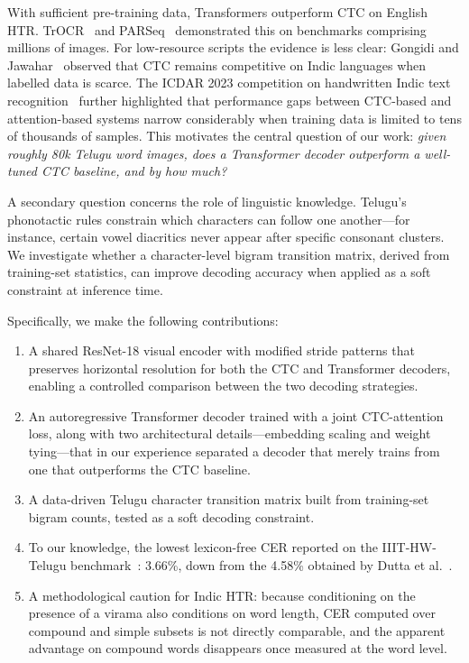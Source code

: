 \documentclass[pdflatex,sn-mathphys-num]{sn-jnl}
\begin{document}
With sufficient pre-training data, Transformers outperform CTC on English HTR. TrOCR~\cite{li2023trocr} and PARSeq~\cite{bautista2022parseq} demonstrated this on benchmarks comprising millions of images. For low-resource scripts the evidence is less clear: Gongidi and Jawahar~\cite{gongidi2021iiit} observed that CTC remains competitive on Indic languages when labelled data is scarce. The ICDAR 2023 competition on handwritten Indic text recognition~\cite{icdar2023indic} further highlighted that performance gaps between CTC-based and attention-based systems narrow considerably when training data is limited to tens of thousands of samples. This motivates the central question of our work: \textit{given roughly 80k Telugu word images, does a Transformer decoder outperform a well-tuned CTC baseline, and by how much?}

A secondary question concerns the role of linguistic knowledge. Telugu's phonotactic rules constrain which characters can follow one another---for instance, certain vowel diacritics never appear after specific consonant clusters. We investigate whether a character-level bigram transition matrix, derived from training-set statistics, can improve decoding accuracy when applied as a soft constraint at inference time.

Specifically, we make the following contributions:

\begin{enumerate}
    \item A shared ResNet-18 visual encoder with modified stride patterns that preserves horizontal resolution for both the CTC and Transformer decoders, enabling a controlled comparison between the two decoding strategies.

    \item An autoregressive Transformer decoder trained with a joint CTC-attention loss, along with two architectural details---embedding scaling and weight tying---that in our experience separated a decoder that merely trains from one that outperforms the CTC baseline.

    \item A data-driven Telugu character transition matrix built from training-set bigram counts, tested as a soft decoding constraint.

    \item To our knowledge, the lowest lexicon-free CER reported on the IIIT-HW-Telugu benchmark~\cite{gongidi2021iiit}: 3.66\%, down from the 4.58\% obtained by Dutta et al.~\cite{dutta2018}.

    \item A methodological caution for Indic HTR: because conditioning on the presence of a virama also conditions on word length, CER computed over compound and simple subsets is not directly comparable, and the apparent advantage on compound words disappears once measured at the word level.
\end{enumerate}
\end{document}
